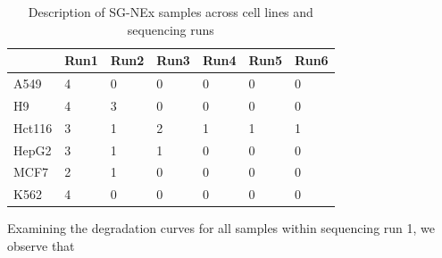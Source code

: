 \begin{table}[H]
  \centering
    \begin{tabular}{|p{1.5cm}|p{1.5cm}|p{1.5cm}|p{1.5cm}|p{1.5cm}|p{1.5cm}|p{1.5cm}|}
\cline{2-7}    \multicolumn{1}{l|}{} & Run1  & Run2  & Run3  & Run4  & Run5  & Run6 \bigstrut\\
    \hline
    A549  & 4     & 0     & 0     & 0     & 0     & 0 \bigstrut\\
    \hline
    H9    & 4     & 3     & 0     & 0     & 0     & 0 \bigstrut\\
    \hline
    Hct116 & 3     & 1     & 2     & 1     & 1     & 1 \bigstrut\\
    \hline
    HepG2 & 3     & 1     & 1     & 0     & 0     & 0 \bigstrut\\
    \hline
    MCF7  & 2     & 1     & 0     & 0     & 0     & 0 \bigstrut\\
    \hline
    K562  & 4     & 0     & 0     & 0     & 0     & 0 \bigstrut\\
    \hline
    \end{tabular}%
      \caption[Description of SG-NEx samples across cell lines and sequencing runs]{Description of SG-NEx samples across cell lines and sequencing runs}
  \label{tab:six-six}%
\end{table}%

Examining the degradation curves for all samples within sequencing run 1, we observe that 



